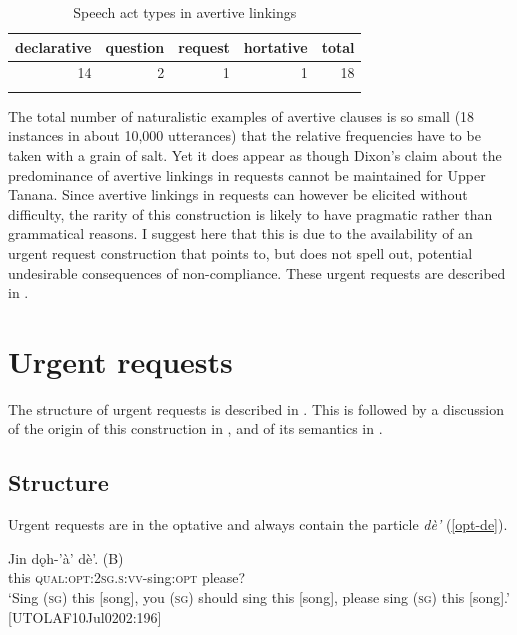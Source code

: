 \documentclass[output=paper,colorlinks,citecolor=brown
]{langscibook}
\begin{document}
\begin{table}
\caption{Speech act types in avertive linkings}
\label{tab:avertive-freq}
 \begin{tabular}{rrrrr}
  \lsptoprule
  declarative & question  & request & hortative & total \\   \midrule
  14 & 2 & 1 & 1 & 18\\
  \lspbottomrule
 \end{tabular}
\end{table}

The total number of naturalistic examples of avertive clauses is so small (18 instances in about 10,000 utterances) that the relative frequencies have to be taken with a grain of salt. Yet it does appear as though Dixon's claim about the predominance of avertive linkings in requests cannot be maintained for Upper Tanana. Since avertive linkings in requests can however be elicited without difficulty, the rarity of this construction is likely to have pragmatic rather than grammatical reasons. I suggest here that this is due to the availability of an urgent request construction that points to, but does not spell out, potential undesirable consequences of non-compliance. These urgent requests are described in .

\section{Urgent requests}
\label{section:apprehensional}

The structure of urgent requests is described in . This is followed by a discussion of the origin of this construction in , and of its semantics in .

\subsection{Structure}
\label{subsection:urgent-structure}

Urgent requests are in the optative and always contain the particle  \textit{dè'} (\ref{opt-de}). 

\begin{exe}
\ex \label{opt-de}
\gll Jin dǫh-'à' dè'. \textnormal{(B)}\\
this \textsc{qual:opt:2sg.s:vv}-sing:\textsc{opt} please? \\
\glt `Sing (\textsc{sg}) this [song], you (\textsc{sg}) should sing this [song], please sing (\textsc{sg}) this [song].' \hfill [UTOLAF10Jul0202:196]
\end{exe}
\end{document}
